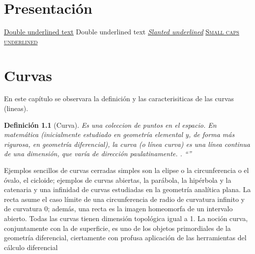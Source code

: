 \documentclass[a4paper]{book}
\newtheorem{defn}[thm]{Definición}
\begin{document}
\renewcommand\listtablename{Lista de tablas}
\listoftables
\newpage

\clearpage

\chapter*{Presentación}

\underline{\underline{Double underlined text}}
{Double underlined text}
\textsl{\underline{Slanted underlined}}
\textsc{\underline{Small caps underlined}}












\chapter{Curvas}
\setcounter{page}{1}

En este capítulo se observara la definición y las caracterisiticas de las curvas (lineas).

\begin{defn}[Curva]
Es una coleccion de puntos en el espacio. En matemática (inicialmente estudiado en geometría elemental y, de forma más rigurosa, en geometría diferencial), la curva (o línea curva) es una línea continua de una dimensión, que varía de dirección paulatinamente. \cite{hilbert2020geometry}. ``''
\end{defn}

Ejemplos sencillos de curvas cerradas simples son la elipse o la circunferencia o el óvalo, el cicloide; ejemplos de curvas abiertas, la parábola, la hipérbola y la catenaria y una infinidad de curvas estudiadas en la geometría analítica plana. La recta asume el caso límite de una circunferencia de radio de curvatura infinito y de curvatura 0; además, una recta es la imagen homeomorfa de un intervalo abierto. Todas las curvas tienen dimensión topológica igual a 1. La noción curva, conjuntamente con la de superficie, es uno de los objetos primordiales de la geometría diferencial, ciertamente con profusa aplicación de las herramientas del cálculo diferencial
\end{document}
